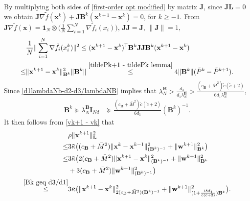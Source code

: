 \documentclass[10pt,a4paper]{amsart}
\begin{document}
By multiplying both sides of \eqref{first-order opt modified} by matrix $\mathbf{J}$, since $\mathbf{J}\mathbf{L}=0$ we obtain $\mathbf{J}\nabla \tilde{f}(\mathbf{x}^{k}) + \mathbf{J}\mathbf{B}^k(\mathbf{x}^{k+1}-\mathbf{x}^{k})=0$, for $k \geq -1.$
From $\mathbf{J}\nabla \tilde{f}(\mathbf{x})=\mathbf{1}_N \otimes\big(\frac{1}{N} \sum_{i=1}^{N}\nabla\tilde{f}_i(x_i)\big)$, $\mathbf{J}\mathbf{J}=\mathbf{J}$, $\|\mathbf{J}\|=1$,
\begin{align}
	&\frac{1}{N}\|\sum_{i=1}^N \nabla \tilde{f}_i(x_i^k)\|^2 \leq (\mathbf{x}^{k+1}-\mathbf{x}^{k})^{\mathsf{T}}\mathbf{B}^k\mathbf{J}\mathbf{J}\mathbf{B}^k(\mathbf{x}^{k+1}-\mathbf{x}^{k}) \notag\\
	\leq & \|\mathbf{x}^{k+1}-\mathbf{x}^{k}\|^2_{\mathbf{B}^k}\|\mathbf{B}^k\| 
	\overset{\eqref{tildePk+1 - tildePk lemma}}{\leq} 4\|\mathbf{B}^k\|(\tilde{P}^k-\tilde{P}^{k+1}). \label{bounded gradient norm Bk}
\end{align}
Since \eqref{d1lambdaNb-d2-d3/lambdaNB} implies that $\lambda_N^{\mathbf{B}}> \frac{d_3}{d_1\lambda_N^{\mathbf{B}}}>\frac{(c_{\mathbf{B}}+\bar{M}^2)\tilde{c}(\tilde{c}+2)}{6d_1\lambda_N^{\mathbf{B}}}$, 
\begin{align}
	\mathbf{B}^k \succeq \lambda_N^{\mathbf{B}}\mathbf{I}_{Nd}&\succeq \frac{(c_{\mathbf{B}}+\bar{M}^2)\tilde{c}(\tilde{c}+2)}{6d_1}(\mathbf{B}^k)^{-1}. \label{Bk geq d3/d1}
\end{align}
It then follows from \eqref{vk+1 - vk} that
\begin{align}
	&\rho\|\mathbf{x}^{k+1}\|^2_\mathbf{L} \notag\\
	\leq& 3\tilde{\kappa}\big((c_{\mathbf{B}}+\bar{M}^2)\|\mathbf{x}^k-\mathbf{x}^{k-1}\|^2_{(\mathbf{B}^k)^{-1}}+\|\mathbf{w}^{k+1}\|^2_{\mathbf{B}^k}\big) \notag\\
	\leq& 3\tilde{\kappa}\big(2(c_{\mathbf{B}}+\bar{M}^2)\|\mathbf{x}^{k+1}-\mathbf{x}^k\|^2_{(\mathbf{B}^k)^{-1}}+\|\mathbf{w}^{k+1}\|^2_{\mathbf{B}^k}\notag\\
	&+ 3(c_{\mathbf{B}}+\bar{M}^2)\|\mathbf{w}^{k+1}\|^2_{(\mathbf{B}^k)^{-1}}\big)\notag\\
	\overset{\eqref{Bk geq d3/d1}}{\leq} & 3\tilde{\kappa}\big(\|\mathbf{x}^{k+1}-\mathbf{x}^k\|^2_{2(c_{\mathbf{B}}+\bar{M}^2)(\mathbf{B}^k)^{-1}}+ \|\mathbf{w}^{k+1}\|^2_{(1+\frac{18d_1}{\tilde{c}(\tilde{c}+2)})\mathbf{B}^k}\big). \notag
\end{align}
\end{document}
